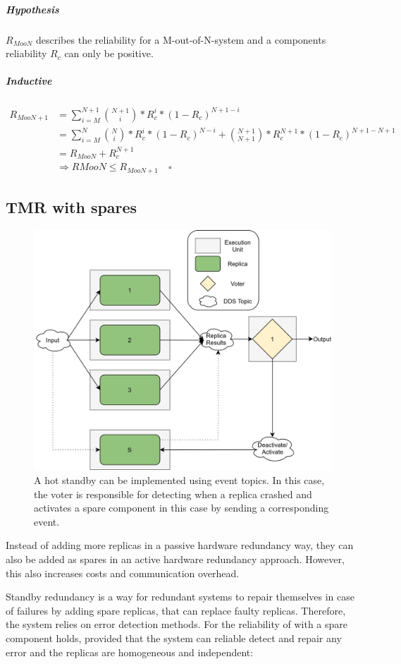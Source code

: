 \subparagraph{Hypothesis}
\begin{center}
$R_{MooN}$ describes the reliability for a M-out-of-N-system and a components reliability $R_{c}$ can only be positive.
\end{center}

\subparagraph{Inductive}
\begin{align*}
R_{MooN+1} &= \sum_{i=M}^{N+1} {N + 1 \choose i} * R_{c}^i * (1 - R_c)^{N + 1 - i}\\
&= \sum_{i=M}^{N} {N \choose i} * R_{c}^i * (1 - R_c)^{N - i} + {N+1 \choose N+1} * R_c^{N+1} * (1 - R_c)^{N+1 - N+1}\\
&= R_{MooN} + R_c^{N+1} \\
&\Rightarrow R{MooN} \leq R_{MooN+1} \quad \square
\end{align*}

\subsection{\Gls*{TMR} with spares}
\begin{figure}[!hb]
	\centering
	\includegraphics[width=0.75\linewidth]{images/TMRWithSparesDDS}
	\caption{A hot standby can be implemented using  event topics. In this case, the voter is responsible for detecting when a replica crashed and activates a spare component in this case by sending a corresponding event.}
	\label{fig:TMRWithSparesDDS}
\end{figure}

Instead of adding more replicas in a passive hardware redundancy way, they can also be added as spares in an active hardware redundancy approach.
However, this also increases costs and communication overhead.

Standby redundancy is a way for redundant systems to repair themselves in case of failures by adding spare replicas, that can replace faulty replicas.
Therefore, the system relies on error detection methods.
For the reliability of  with a spare component holds, provided that the system can reliable detect and repair any error and the replicas are homogeneous and independent:

